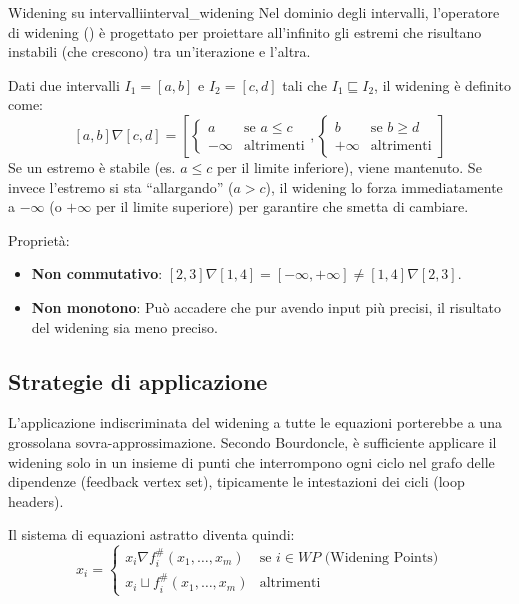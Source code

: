 \begin{esempio}{Widening su intervalli}{interval_widening}
Nel dominio degli intervalli, l'operatore di widening ()
è progettato per proiettare all'infinito gli estremi che risultano instabili
(che crescono) tra un'iterazione e l'altra.

Dati due intervalli $I_1 = [a, b]$ e $I_2 = [c, d]$ tali che $I_1
\sqsubseteq I_2$, il widening è definito come:
\[
[a, b] \nabla [c, d] =
\left[
    \begin{cases} a & \text{se } a \le c \\ -\infty & \text{altrimenti} \end{cases},
    \begin{cases} b & \text{se } b \ge d \\ +\infty & \text{altrimenti} \end{cases}
\right]
\]
Se un estremo è stabile (es. $a \le c$ per il limite inferiore), viene
mantenuto.
Se invece l'estremo si sta ``allargando'' ($a > c$), il widening lo forza
immediatamente a $-\infty$ (o $+\infty$ per il limite superiore) per garantire
che smetta di cambiare.

Proprietà:
\begin{itemize}
    \item \textbf{Non commutativo}:
    $[2,3] \nabla [1,4] = [-\infty, +\infty] \neq [1,4] \nabla [2,3]$.
    \item \textbf{Non monotono}: Può accadere che pur avendo input più
    precisi, il risultato del widening sia meno preciso.
\end{itemize}

\end{esempio}

\subsection{Strategie di applicazione}

L'applicazione indiscriminata del widening a tutte le equazioni porterebbe a
una grossolana sovra-approssimazione.
Secondo Bourdoncle, è sufficiente applicare il widening solo in un insieme di
punti che interrompono ogni ciclo nel grafo delle dipendenze (feedback vertex
set), tipicamente le intestazioni dei cicli (loop headers).

Il sistema di equazioni astratto diventa quindi:
\[
x_i =
\begin{cases}
    x_i \nabla f_i^\#(x_1, \dots, x_m) & \text{se } i \in WP \text{ (Widening Points)} \\
    x_i \sqcup f_i^\#(x_1, \dots, x_m) & \text{altrimenti}
\end{cases}
\]

